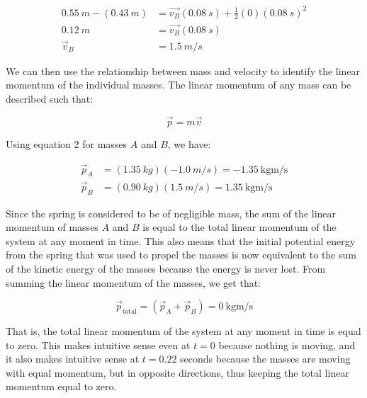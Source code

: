 \documentclass[12pt]{article}
\begin{document}
\begin{equation*}
    \begin{split}
        \SI{0.55}{m} - (\SI{0.43}{m}) & = \vec{v_B}(\SI{0.08}{s}) + \frac{1}{2}(0)(\SI{0.08}{s})^2 \\
        \SI{0.12}{m} & = \vec{v_B}(\SI{0.08}{s}) \\
        \vec{v}_B & = \SI{1.5}{m/s}
    \end{split}
\end{equation*}

We can then use the relationship between mass and velocity to identify the linear momentum of the individual masses. The linear momentum of any mass can be described such that:

\begin{equation} \label{eq2}
    \vec{p} = m\vec{v}
\end{equation}

Using equation 2 for masses $A$ and $B$, we have:

\begin{equation*}
    \begin{split}
        \vec{p}_A & = (\SI{1.35}{kg})(\SI{-1.0}{m/s}) = \SI{-1.35}{\kilogram\metre\per\second} \\
        \vec{p}_B & = (\SI{0.90}{kg})(\SI{1.5}{m/s}) = \SI{1.35}{\kilogram\metre\per\second}
    \end{split}
\end{equation*}

Since the spring is considered to be of negligible mass, the sum of the linear momentum of masses $A$ and $B$ is equal to the total linear momentum of the system at any moment in time. This also means that the initial potential energy from the spring that was used to propel the masses is now equivalent to the sum of the kinetic energy of the masses because the energy is never lost. From summing the linear momentum of the masses, we get that:

\begin{equation*}
    \vec{p}_\text{total} = (\vec{p}_A + \vec{p}_B) = \SI{0}{\kilogram\metre\per\second}
\end{equation*}

That is, the total linear momentum of the system at any moment in time is equal to zero. This makes intuitive sense even at $t = 0$ because nothing is moving, and it also makes intuitive sense at $t = 0.22$ seconds because the masses are moving with equal momentum, but in opposite directions, thus keeping the total linear momentum equal to zero.
\end{document}
